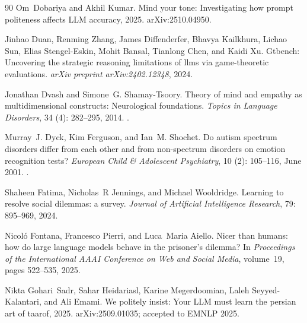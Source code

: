 \begin{thebibliography}{90}
Om~Dobariya and Akhil Kumar.
\newblock Mind your tone: Investigating how prompt politeness affects {LLM} accuracy, 2025.
\newblock arXiv:2510.04950.

Jinhao Duan, Renming Zhang, James Diffenderfer, Bhavya Kailkhura, Lichao Sun, Elias Stengel-Eskin, Mohit Bansal, Tianlong Chen, and Kaidi Xu.
\newblock Gtbench: Uncovering the strategic reasoning limitations of llms via game-theoretic evaluations.
\newblock \emph{arXiv preprint arXiv:2402.12348}, 2024.

Jonathan Dvash and Simone~G. Shamay-Tsoory.
\newblock Theory of mind and empathy as multidimensional constructs: Neurological foundations.
\newblock \emph{Topics in Language Disorders}, 34 (4): 282--295, 2014.
\newblock {}.

Murray~J. Dyck, Kim Ferguson, and Ian~M. Shochet.
\newblock Do autism spectrum disorders differ from each other and from non-spectrum disorders on emotion recognition tests?
\newblock \emph{European Child \& Adolescent Psychiatry}, 10 (2): 105--116, June 2001.
\newblock {}.

Shaheen Fatima, Nicholas~R Jennings, and Michael Wooldridge.
\newblock Learning to resolve social dilemmas: a survey.
\newblock \emph{Journal of Artificial Intelligence Research}, 79: 895--969, 2024.

Nicol{\'o} Fontana, Francesco Pierri, and Luca~Maria Aiello.
\newblock Nicer than humans: how do large language models behave in the prisoner's dilemma?
\newblock In \emph{Proceedings of the International AAAI Conference on Web and Social Media}, volume~19, pages 522--535, 2025.

Nikta Gohari~Sadr, Sahar Heidariasl, Karine Megerdoomian, Laleh Seyyed-Kalantari, and Ali Emami.
\newblock We politely insist: Your {LLM} must learn the persian art of taarof, 2025.
\newblock arXiv:2509.01035; accepted to EMNLP 2025.


\end{thebibliography}

